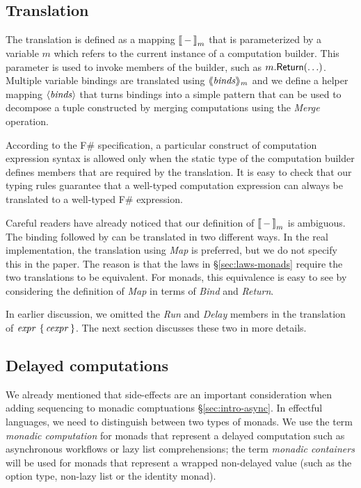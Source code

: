 \documentclass[runningheads,a4paper]{llncs}
\begin{document}

\subsection{Translation}
\label{sec:semantics-transl}

The translation is defined as a mapping $|[ \,-\, |]_m$ that is parameterized by a variable $m$ which
refers to the current instance of a computation builder. This parameter is used 
to invoke members of the builder, such as $m.\textnormal{\sffamily Return}(\ldots)$. Multiple 
variable bindings are translated using $\langle\hspace{-0.25em}\langle \textnormal{\emph{binds}} \rangle\hspace{-0.25em}\rangle_m$ and we define a helper mapping 
$\langle \textnormal{\emph{binds}} \rangle$ that turns bindings into a simple pattern that can be used to decompose a tuple
constructed by merging computations using the \emph{Merge} operation.

According to the F\# specification, a particular construct of computation expression syntax is
allowed only when the static type of the computation builder defines members that are required
by the translation. It is easy to check that our typing rules guarantee that a well-typed computation
expression can always be translated to a well-typed F\# expression.

Careful readers have already noticed that our definition of $|[ \,-\, |]_m$ is ambiguous. The 
 binding followed by  can be translated in two different ways. In the
real implementation, the translation using \emph{Map} is preferred, but we do not specify this in
the paper. The reason is that the laws in \S\ref{sec:laws-monads} require the two translations to
be equivalent. For monads, this equivalence is easy to see by considering the definition of
\emph{Map} in terms of \emph{Bind} and \emph{Return}.

In earlier discussion, we omitted the \emph{Run} and \emph{Delay} members in the translation of
$\textnormal{\emph{expr}}~\{\,\textnormal{\emph{cexpr}}\,\}$. The next section discusses these two in more details.


\subsection{Delayed computations}
\label{sec:semantics-delayed}

We already mentioned that side-effects are an important consideration when adding sequencing to
monadic comptuations \S\ref{sec:intro-async}. In effectful languages, we need to distinguish 
between two types of monads. We use the term \emph{monadic computation} for monads that represent 
a delayed computation such as asynchronous workflows or lazy list comprehensions; the term 
\emph{monadic containers} will be used for monads that represent a wrapped non-delayed value
(such as the option type, non-lazy list or the identity monad).
\end{document}
